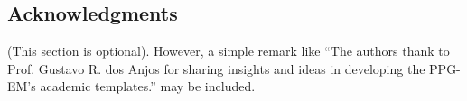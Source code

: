 \documentclass[date]{ppgem}
\begin{document}
\begin{multicols}{2}
\section{Acknowledgments}

(This section is optional). However, a simple remark like ``The authors thank to Prof. Gustavo R. dos Anjos for sharing insights and ideas in developing the PPG-EM's academic templates.'' 
may be included. 




\end{multicols}
\end{document}

